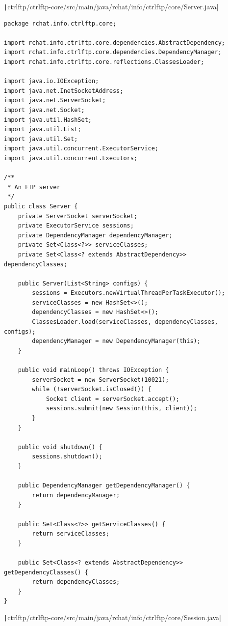 \documentclass[a4paper,14pt]{extarticle}
\begin{document}
\texttt|ctrlftp/ctrlftp-core/src/main/java/rchat/info/ctrlftp/core/Server.java|
\begin{verbatim}
package rchat.info.ctrlftp.core;

import rchat.info.ctrlftp.core.dependencies.AbstractDependency;
import rchat.info.ctrlftp.core.dependencies.DependencyManager;
import rchat.info.ctrlftp.core.reflections.ClassesLoader;

import java.io.IOException;
import java.net.InetSocketAddress;
import java.net.ServerSocket;
import java.net.Socket;
import java.util.HashSet;
import java.util.List;
import java.util.Set;
import java.util.concurrent.ExecutorService;
import java.util.concurrent.Executors;

/**
 * An FTP server
 */
public class Server {
    private ServerSocket serverSocket;
    private ExecutorService sessions;
    private DependencyManager dependencyManager;
    private Set<Class<?>> serviceClasses;
    private Set<Class<? extends AbstractDependency>> dependencyClasses;

    public Server(List<String> configs) {
        sessions = Executors.newVirtualThreadPerTaskExecutor();
        serviceClasses = new HashSet<>();
        dependencyClasses = new HashSet<>();
        ClassesLoader.load(serviceClasses, dependencyClasses, configs);
        dependencyManager = new DependencyManager(this);
    }

    public void mainLoop() throws IOException {
        serverSocket = new ServerSocket(10021);
        while (!serverSocket.isClosed()) {
            Socket client = serverSocket.accept();
            sessions.submit(new Session(this, client));
        }
    }

    public void shutdown() {
        sessions.shutdown();
    }

    public DependencyManager getDependencyManager() {
        return dependencyManager;
    }

    public Set<Class<?>> getServiceClasses() {
        return serviceClasses;
    }

    public Set<Class<? extends AbstractDependency>> getDependencyClasses() {
        return dependencyClasses;
    }
}
\end{verbatim}
\texttt|ctrlftp/ctrlftp-core/src/main/java/rchat/info/ctrlftp/core/Session.java|
\end{document}

